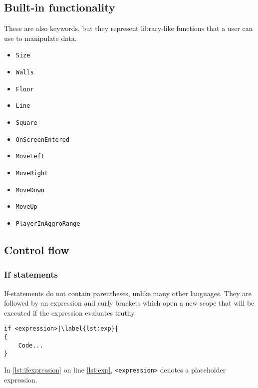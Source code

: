 \subsection{Built-in functionality}
These are also keywords, but they represent library-like functions that a user can use to manipulate data.
\begin{multicols}{3}
    \begin{itemize}
        \item \texttt{Size}
        \item \texttt{Walls}
        \item \texttt{Floor}
        \item \texttt{Line}
        \item \texttt{Square}
        \item \texttt{OnScreenEntered}
        \item \texttt{MoveLeft}
        \item \texttt{MoveRight}
        \item \texttt{MoveDown}
        \item \texttt{MoveUp}
        \item \texttt{PlayerInAggroRange}
    \end{itemize}
\end{multicols}

\subsection{Control flow}
\subsubsection{If statements}
If-statements do not contain parentheses, unlike many other languages. They are followed by an expression and curly brackets which open a new scope that will be executed if the expression evaluates truthy.

\begin{lstlisting}[caption={Example of an if statement}, label={lst:ifexpression},escapechar=|]
if <expression>|\label{lst:exp}|
{
    Code...
}
\end{lstlisting}

In \ref{lst:ifexpression} on line \ref{lst:exp},  \verb|<expression>| denotes a placeholder expression.


